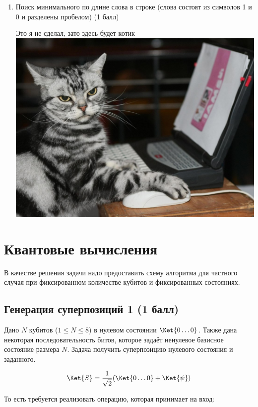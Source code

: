 \documentclass[a4paper,12pt]{article}
\begin{document}
\begin{enumerate}
    \item Поиск минимального по длине слова в строке (слова состоят из символов 1 и 0 и разделены пробелом) (1 балл)
    
    \begin{center}
        Это я не сделал, зато здесь будет котик
        \includegraphics[scale=0.2]{img/1_2_3.jpg}
    \end{center}
\end{enumerate}


\section{Квантовые вычисления}

В качестве решения задачи надо предоставить схему алгоритма для частного случая при фиксированном количестве кубитов и фиксированных состояниях. 


\subsection{Генерация суперпозиций 1 (1 балл)}

Дано $N$ кубитов ($1 \le N \le 8$) в нулевом состоянии $\Ket{0\dots0}$. Также дана некоторая последовательность битов, которое задаёт ненулевое базисное состояние размера $N$. Задача получить суперпозицию нулевого состояния и заданного.

$$\Ket{S} = \frac{1}{\sqrt2}(\Ket{0\dots0} +\Ket{\psi})$$

То есть требуется реализовать операцию, которая принимает на вход:
\end{document}

